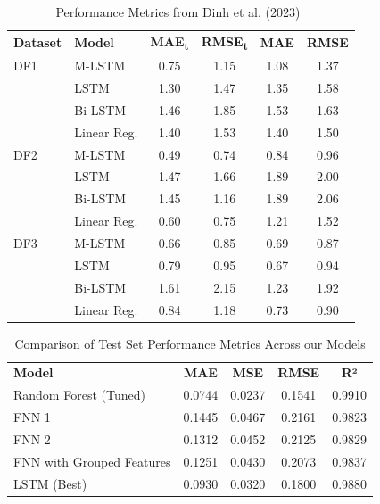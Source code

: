 \begin{table}[H]
\centering
\caption{Performance Metrics from Dinh et al. (2023)~\cite{khan2024image}}
\begin{tabular}{llcccc}

\textbf{Dataset} & \textbf{Model} & \textbf{MAE\textsubscript{t}} & \textbf{RMSE\textsubscript{t}} & \textbf{MAE} & \textbf{RMSE} \\

{ DF1} 
& M-LSTM &  0.75  &  1.15  & 1.08 & 1.37 \\
& LSTM   & 1.30 & 1.47 & 1.35 & 1.58 \\
& Bi-LSTM & 1.46 & 1.85 & 1.53 & 1.63 \\
& Linear Reg. & 1.40 & 1.53 & 1.40 & 1.50 \\
{ DF2}  
& M-LSTM &  0.49  &  0.74  & 0.84 & 0.96 \\
& LSTM   & 1.47 & 1.66 & 1.89 & 2.00 \\
& Bi-LSTM & 1.45 & 1.16 & 1.89 & 2.06 \\
& Linear Reg. & 0.60 & 0.75 & 1.21 & 1.52 \\
{ DF3}  
& M-LSTM &  0.66  &  0.85  & 0.69 & 0.87 \\
& LSTM   & 0.79 & 0.95 & 0.67 & 0.94 \\
& Bi-LSTM & 1.61 & 2.15 & 1.23 & 1.92 \\
& Linear Reg. & 0.84 & 1.18 & 0.73 & 0.90 \\

\end{tabular}
\label{tab:dinh2023_results}
\end{table}



\begin{table}[H]
\centering
\caption{Comparison of Test Set Performance Metrics Across our Models}
\begin{tabular}{lcccc}

\textbf{Model} & \textbf{MAE} & \textbf{MSE} & \textbf{RMSE} & \textbf{R²} \\
 Random Forest (Tuned)  & 0.0744 & 0.0237 & 0.1541 & 0.9910 \\
 FNN 1  & 0.1445 & 0.0467 & 0.2161 & 0.9823 \\
 FNN 2  & 0.1312 & 0.0452 & 0.2125 & 0.9829 \\
 FNN with Grouped Features  & 0.1251 & 0.0430 & 0.2073 & 0.9837 \\
 LSTM (Best)  &  0.0930  &  0.0320  &  0.1800  &  0.9880  \\
\end{tabular}
\label{tab:comparison_test_metrics}
\end{table}

